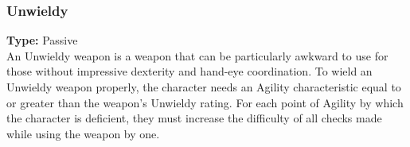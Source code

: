 \subsubsection{Unwieldy}
\label{iqty:unwieldy}
\textbf{Type:} Passive\\
An Unwieldy weapon is a weapon that can be particularly awkward to use for those
without impressive dexterity and hand-eye coordination. To wield an Unwieldy
weapon properly, the character needs an Agility characteristic equal to or
greater than the weapon's Unwieldy rating. For each point of Agility by which
the character is deficient, they must increase the difficulty of all checks
made while using the weapon by one.
